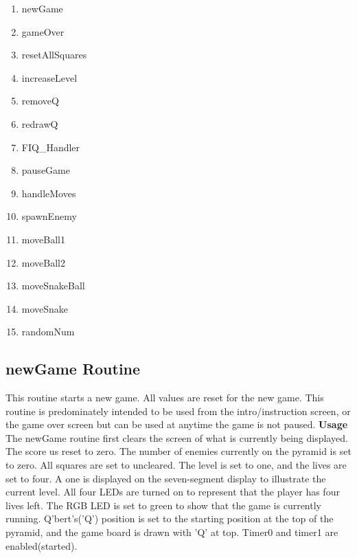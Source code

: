     \begin {enumerate}
	\item{} newGame
        \item{} gameOver
	\item{} resetAllSquares
	\item{} increaseLevel
	\item{} removeQ
	\item{} redrawQ
	\item{} FIQ\_Handler
	\item{} pauseGame
	\item{} handleMoves
	\item{} spawnEnemy
	\item{} moveBall1
	\item{} moveBall2
	\item{} moveSnakeBall
	\item{} moveSnake
	\item{} randomNum

	
    \end {enumerate}

\newpage
  \subsection{newGame Routine}
   \indent
    This routine starts a new game. All values are reset for the new game.
    This routine is predominately intended to be used from the intro/instruction
    screen, or the game over screen but can be used at anytime the game is not
    paused.
   \vskip 8pt
   \noindent
   {\bf Usage }\\
    The newGame routine first clears the screen of what is currently 
    being displayed. The score us reset to zero. The number of enemies
    currently on the pyramid is set to zero. All squares are set to 
    uncleared. The level is set to one, and the lives are set to four.
    A one is displayed on the seven-segment display to illustrate the 
    current level. All four LEDs are turned on to represent that the 
    player has four lives left. The RGB LED is set to green to show
    that the game is currently running. Q'bert's('Q') position is set
    to the starting position at the top of the pyramid, and the game
    board is drawn with 'Q' at top. Timer0 and timer1 are enabled(started).
 \vskip 8pt
  \noindent

